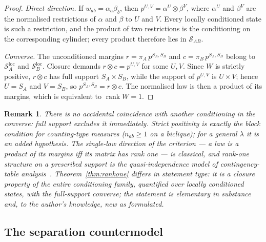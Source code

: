 \documentclass[11pt,a4paper]{article}
\newtheorem{remark}[theorem]{Remark}
\newcommand{\SAB}{\mathcal{S}_{AB}}
\newcommand{\SAloc}{\mathcal{S}_A^{\mathrm{loc}}}
\newcommand{\SBloc}{\mathcal{S}_B^{\mathrm{loc}}}
\newcommand{\rk}{\operatorname{rank}}
\begin{document}
    \begin{proof}
      \emph{Direct direction.}
      If $w_{ab} = \alpha_a \beta_b$, then $p^{U,V} = \alpha^U \otimes \beta^V$, where $\alpha^U$ and
      $\beta^V$ are the normalised restrictions of $\alpha$ and $\beta$ to $U$ and $V$.
      Every locally conditioned state is such a restriction, and the product of two restrictions is the
      conditioning on the corresponding cylinder; every product therefore lies in $\SAB$.

      \emph{Converse.}
      The unconditioned margins $r = \pi_A\, p^{S_A, S_B}$ and $c = \pi_B\, p^{S_A, S_B}$ belong to
      $\SAloc$ and $\SBloc$.
      Closure demands $r \otimes c = p^{U,V}$ for some $U, V$.
      Since $W$ is strictly positive, $r \otimes c$ has full support $S_A \times S_B$, while the support of
      $p^{U,V}$ is $U \times V$; hence $U = S_A$ and $V = S_B$, so $p^{S_A,S_B} = r \otimes c$.
      The normalised law is then a product of its margins, which is equivalent to $\rk W = 1$.
    \end{proof}

    \begin{remark}
      \label{rem:nocoincidence}
      There is no accidental coincidence with another conditioning in the converse: full support excludes it
      immediately.
      Strict positivity is exactly the block condition for counting-type measures ($n_{ab} \geq 1$ on a
      biclique); for a general $\lambda$ it is an added hypothesis.
      The single-law direction of the criterion --- a law is a product of its margins iff its matrix has rank
      one --- is classical, and rank-one structure on a prescribed support is the quasi-independence model of
      contingency-table analysis~\cite{Goodman1968}.
      Theorem~\ref{thm:rankone} differs in statement type: it is a closure property of the entire
      conditioning family, quantified over locally conditioned states, with the full-support converse; the
      statement is elementary in substance and, to the author's knowledge, new as formulated.
    \end{remark}

  \subsection{The separation countermodel}
    \label{ssec:countermodel}
\end{document}
